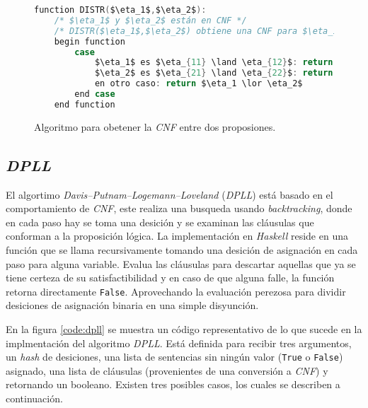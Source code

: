\begin{figure}
\begin{lstlisting}[language=C,mathescape=true,keywordstyle=\color{black}]
    function DISTR($\eta_1$,$\eta_2$):
    /* $\eta_1$ y $\eta_2$ están en CNF */
    /* DISTR($\eta_1$,$\eta_2$) obtiene una CNF para $\eta_1 \lor \eta_2$ */
    begin function
        case
            $\eta_1$ es $\eta_{11} \land \eta_{12}$: return DISTR($\eta_{11}$,$\eta_{2}$) $\land$ DISTR($\eta_{12}$,$\eta_{2}$)
            $\eta_2$ es $\eta_{21} \land \eta_{22}$: return DISTR($\eta_1$,$\eta_{21}$) $\land$ DISTR($\eta_1$,$\eta_{22}$)
            en otro caso: return $\eta_1 \lor \eta_2$
        end case
    end function
\end{lstlisting}
\caption{Algoritmo para obetener la \textit{CNF} entre dos proposiones.}
\label{code:distr}
\end{figure}

\subsection{\textit{DPLL}}

El algortimo \textit{Davis–Putnam–Logemann–Loveland} (\textit{DPLL})\cite{Davis} está basado en el comportamiento de \textit{CNF}, este realiza una busqueda usando \textit{backtracking}, donde en cada paso hay se toma una desición y se examinan las cláusulas que conforman a la proposición lógica. La implementación en \textit{Haskell} reside en una función que se llama recursivamente tomando una desición de asignación en cada paso para alguna variable. Evalua las cláusulas para descartar aquellas que ya se tiene certeza de su satisfactibilidad y en caso de que alguna falle, la función retorna directamente \texttt{False}. Aprovechando la evaluación perezosa para dividir desiciones de asignación binaria en una simple disyunción.

En la figura \ref{code:dpll} se muestra un código representativo de lo que sucede en la implmentación del algoritmo \textit{DPLL}. Está definida para recibir tres argumentos, un \textit{hash} de desiciones, una lista de sentencias sin ningún valor (\texttt{True} o \texttt{False}) asignado, una lista de cláusulas (provenientes de una conversión a \textit{CNF}) y retornando un booleano. Existen tres posibles casos, los cuales se describen a continuación.

